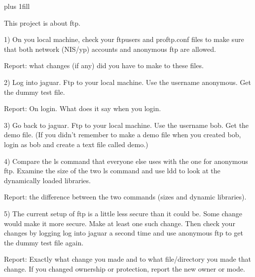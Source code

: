 
\rightskip=0pt plus 1fill

\parindent 0pt

This project is about ftp.

1) On you local machine, check your {\ltt{}ftpusers}
and {\ltt{}proftp.conf} files to make sure that
both network (NIS/yp) accounts and anonymous ftp
are allowed.

Report: what changes (if any) did you have to make to these
files.

2) Log into jaguar.
Ftp to your local machine.
Use the username anonymous.
Get the dummy test file.

Report: On login. What does it say when you login.

3) Go back to jaguar.
Ftp to your local machine.
Use the username bob.
Get the {\ltt{}demo} file.
(If you didn't remember to make a demo file when you created
bob, login as bob and create a text file called demo.)

4) Compare the {\ltt{}ls} command that everyone else uses with the
one for anonymous ftp.
Examine the size of the two ls command
and use {\ltt{}ldd} to look at the dynamically loaded libraries.

Report: the difference between the two commands (sizes and dynamic libraries).

5) The current setup of ftp is a little less secure than it
could be.
Some change would make it more secure.
Make at least one such change.
Then check your changes by logging log into jaguar a second time
and use anonymous ftp to get the dummy test file again.

Report: Exactly what change you made and to what
file/directory you made that change.
If you changed ownership or protection, report the new owner or mode.
\bye
